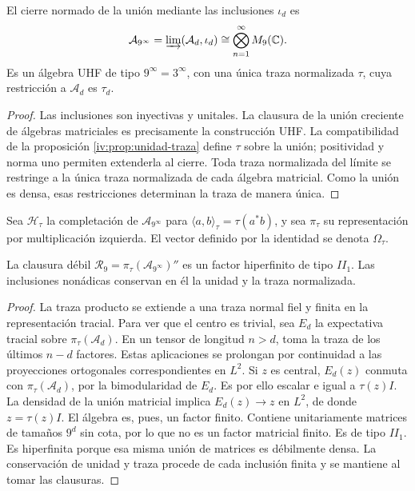 \begin{theorem}
\label{iv:thm:uhf}
El cierre normado de la unión mediante las inclusiones \(\iota_d\)
es
\[
 \mathcal A_{9^\infty}
 =\varinjlim(\mathcal A_d,\iota_d)
 \cong\bigotimes_{n=1}^{\infty}M_9(\mathbb C).
\]
Es un álgebra UHF de tipo \(9^\infty=3^\infty\), con una única
traza normalizada \(\tau\), cuya restricción a \(\mathcal A_d\)
es \(\tau_d\).
\end{theorem}
\begin{proof}
Las inclusiones son inyectivas y unitales. La clausura de la unión
creciente de álgebras matriciales es precisamente la construcción UHF.
La compatibilidad de la proposición \ref{iv:prop:unidad-traza}
define \(\tau\) sobre la unión; positividad y norma uno permiten
extenderla al cierre. Toda traza normalizada del límite se restringe
a la única traza normalizada de cada álgebra matricial. Como la unión
es densa, esas restricciones determinan la traza de manera única.
\end{proof}

Sea \(\mathcal H_\tau\) la completación de
\(\mathcal A_{9^\infty}\) para
\(\langle a,b\rangle_\tau=\tau(a^*b)\), y sea \(\pi_\tau\)
su representación por multiplicación izquierda. El vector definido
por la identidad se denota \(\Omega_\tau\).

\begin{theorem}
\label{iv:thm:factor-tracial}
La clausura débil
\(\mathcal R_9=\pi_\tau(\mathcal A_{9^\infty})''\)
es un factor hiperfinito de tipo \(II_1\). Las inclusiones
nonádicas conservan en él la unidad y la traza normalizada.
\end{theorem}
\begin{proof}
La traza producto se extiende a una traza normal fiel y finita
en la representación tracial. Para ver que el centro es trivial,
sea \(E_d\) la expectativa tracial sobre \(\pi_\tau(\mathcal A_d)\).
En un tensor de longitud \(n>d\), toma la traza de los últimos
\(n-d\) factores. Estas aplicaciones se prolongan por continuidad
a las proyecciones ortogonales correspondientes en \(L^2\).
Si \(z\) es central, \(E_d(z)\) conmuta con
\(\pi_\tau(\mathcal A_d)\), por la bimodularidad de \(E_d\).
Es por ello escalar e igual a \(\tau(z)I\). La densidad de la
unión matricial implica \(E_d(z)\to z\) en \(L^2\), de donde
\(z=\tau(z)I\). El álgebra es, pues, un factor finito.
Contiene unitariamente matrices de tamaños \(9^d\) sin cota,
por lo que no es un factor matricial finito. Es de tipo \(II_1\).
Es hiperfinita porque esa misma unión de matrices es débilmente
densa. La conservación de unidad y traza procede de cada inclusión
finita y se mantiene al tomar las clausuras.
\end{proof}

